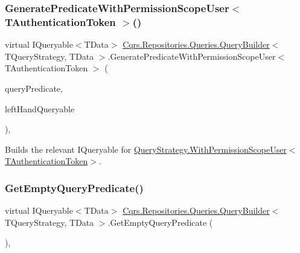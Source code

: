 \subsubsection{\texorpdfstring{Generate\+Predicate\+With\+Permission\+Scope\+User$<$ T\+Authentication\+Token $>$()}{GeneratePredicateWithPermissionScopeUser< TAuthenticationToken >()}}
{\footnotesize\ttfamily virtual I\+Queryable$<$T\+Data$>$ \hyperlink{classCqrs_1_1Repositories_1_1Queries_1_1QueryBuilder}{Cqrs.\+Repositories.\+Queries.\+Query\+Builder}$<$ T\+Query\+Strategy, T\+Data $>$.Generate\+Predicate\+With\+Permission\+Scope\+User$<$ T\+Authentication\+Token $>$ (\begin{DoxyParamCaption}\item[{\hyperlink{classCqrs_1_1Repositories_1_1Queries_1_1QueryPredicate}{Query\+Predicate}}]{query\+Predicate,  }\item[{I\+Queryable$<$ T\+Data $>$}]{left\+Hand\+Queryable }\end{DoxyParamCaption})\hspace{0.3cm}{\ttfamily [protected]}, {\ttfamily [virtual]}}



Builds the relevant I\+Queryable for \hyperlink{classCqrs_1_1Repositories_1_1Queries_1_1QueryStrategy_ad8b52782f5410a399949417b10820780_ad8b52782f5410a399949417b10820780}{Query\+Strategy.\+With\+Permission\+Scope\+User$<$\+T\+Authentication\+Token$>$}. 

\mbox{\label{classCqrs_1_1Repositories_1_1Queries_1_1QueryBuilder_a7dc8f0da3bb4ef54b8cbdda6c50ee0a1_a7dc8f0da3bb4ef54b8cbdda6c50ee0a1}} 
\subsubsection{\texorpdfstring{Get\+Empty\+Query\+Predicate()}{GetEmptyQueryPredicate()}}
{\footnotesize\ttfamily virtual I\+Queryable$<$T\+Data$>$ \hyperlink{classCqrs_1_1Repositories_1_1Queries_1_1QueryBuilder}{Cqrs.\+Repositories.\+Queries.\+Query\+Builder}$<$ T\+Query\+Strategy, T\+Data $>$.Get\+Empty\+Query\+Predicate (\begin{DoxyParamCaption}{ }\end{DoxyParamCaption})\hspace{0.3cm}{\ttfamily [protected]}, {\ttfamily [virtual]}}



